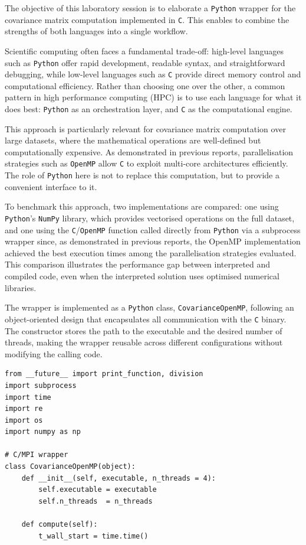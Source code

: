 
The objective of this laboratory session is to elaborate a \texttt{Python} wrapper for the covariance matrix computation implemented in \texttt{C}. This enables to combine the strengths of both languages into a single workflow.

Scientific computing often faces a fundamental trade-off: high-level languages 
such as \texttt{Python} offer rapid development, readable syntax, and 
straightforward debugging, while low-level languages such as \texttt{C} provide 
direct memory control and computational efficiency. Rather than choosing one over the other, a common pattern in high performance computing (HPC) is to use each language for what it does best: \texttt{Python} as an orchestration layer, and \texttt{C} as the computational engine.

This approach is particularly relevant for covariance matrix computation over 
large datasets, where the mathematical operations are well-defined but 
computationally expensive. As demonstrated in previous reports, parallelisation 
strategies such as \texttt{OpenMP} allow \texttt{C} to exploit multi-core 
architectures efficiently. The role of \texttt{Python} here is not to replace 
this computation, but to provide a convenient interface to it.

To benchmark this approach, two implementations are compared: one using 
\texttt{Python}'s \texttt{NumPy} library, which provides vectorised operations 
on the full dataset, and one using the \texttt{C}/\texttt{OpenMP} function called directly from \texttt{Python} via a subprocess wrapper since, as demonstrated in previous reports, the OpenMP implementation achieved the best execution times among the parallelisation strategies evaluated. This comparison illustrates the performance gap between interpreted and compiled code, even when the interpreted solution uses optimised numerical libraries.

The wrapper is implemented as a \texttt{Python} class, \texttt{CovarianceOpenMP}, following an object-oriented design that encapsulates all communication with the \texttt{C} binary. The constructor stores the path to the executable and the desired number of threads, making the wrapper reusable across different configurations without modifying the calling code.

\begin{verbatim}
from __future__ import print_function, division
import subprocess
import time
import re
import os
import numpy as np

# C/MPI wrapper
class CovarianceOpenMP(object):
    def __init__(self, executable, n_threads = 4):
        self.executable = executable
        self.n_threads  = n_threads

    def compute(self):
        t_wall_start = time.time()
\end{verbatim}

